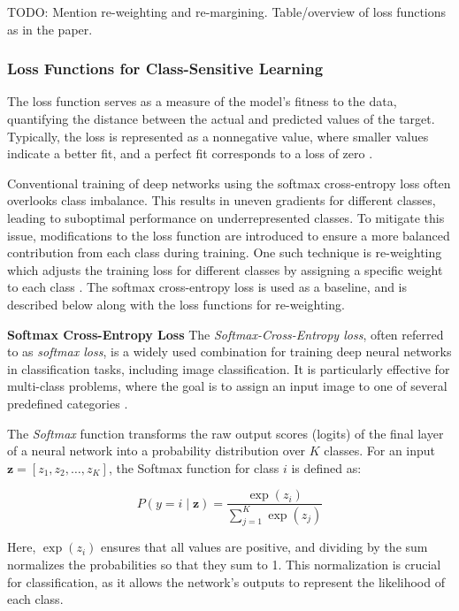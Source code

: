 TODO: Mention re-weighting and re-margining.
Table/overview of loss functions as in the paper.


\subsubsection{Loss Functions for Class-Sensitive Learning}
The loss function serves as a measure of the model's fitness to the data, quantifying the distance between the actual and predicted values of the target. Typically, the loss is represented as a nonnegative value, where smaller values indicate a better fit, and a perfect fit corresponds to a loss of zero \cite{zhang2023dive}.

Conventional training of deep networks using the softmax cross-entropy loss often overlooks class imbalance. This results in uneven gradients for different classes, leading to suboptimal performance on underrepresented classes. To mitigate this issue, modifications to the loss function are introduced to ensure a more balanced contribution from each class during training. One such technique is re-weighting which adjusts the training loss for different classes by assigning a specific weight to each class \cite{zhang2023deep}. The softmax cross-entropy loss is used as a baseline, and is described below along with the loss functions for re-weighting.

\myindent \textbf{Softmax Cross-Entropy Loss}
The \textit{Softmax-Cross-Entropy loss}, often referred to as \textit{softmax loss}, is a widely used combination for training deep neural networks in classification tasks, including image classification. It is particularly effective for multi-class problems, where the goal is to assign an input image to one of several predefined categories \cite{cs231n} \cite{pytorch_crossentropy}.

The \textit{Softmax} function transforms the raw output scores (logits) of the final layer of a neural network into a probability distribution over \( K \) classes. For an input \( \mathbf{z} = [z_1, z_2, \dots, z_K] \), the Softmax function for class \( i \) is defined as:

\begin{equation}
    P(y = i \mid \mathbf{z}) = \frac{\exp(z_i)}{\sum_{j=1}^{K} \exp(z_j)}
\end{equation}

Here, \( \exp(z_i) \) ensures that all values are positive, and dividing by the sum normalizes the probabilities so that they sum to 1. This normalization is crucial for classification, as it allows the network's outputs to represent the likelihood of each class.

